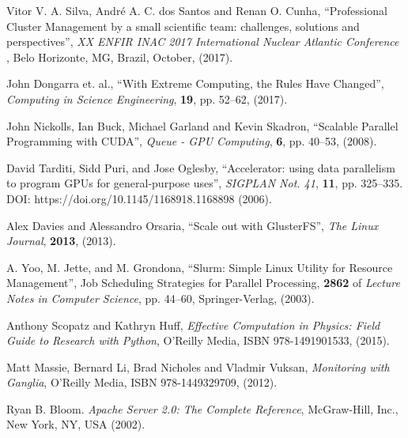 \documentclass[twoside,a4paper,12pt,english]{inac19}
\begin{document}
\begin{thebibliography}{99} %

 Vitor V. A. Silva, Andr\'{e} A. C. dos Santos and Renan O. Cunha, ``Professional Cluster Management
  by a small scientific team: challenges, solutions and perspectives'', \textit{XX ENFIR INAC 2017 International Nuclear Atlantic Conference }, Belo Horizonte, MG, Brazil, October, (2017). 
  
  
 John Dongarra et. al., ``With Extreme Computing, the Rules Have Changed'', \textit{Computing in Science Engineering}, \textbf{19}, pp. 52--62, (2017).
  
 John Nickolls, Ian Buck, Michael Garland and Kevin Skadron, ``Scalable Parallel Programming with CUDA'', \textit{Queue - GPU Computing}, \textbf{6}, pp. 40--53, (2008).
  
 David Tarditi, Sidd Puri, and Jose Oglesby, ``Accelerator: using data parallelism to program GPUs for general-purpose uses'',  \textit{SIGPLAN Not. 41}, \textbf{11}, pp. 325--335. DOI: https://doi.org/10.1145/1168918.1168898 (2006).

 Alex Davies and Alessandro Orsaria, ``Scale out with GlusterFS'', \textit{The Linux Journal}, \textbf{2013}, (2013).

 A. Yoo, M. Jette, and M. Grondona, ``Slurm: Simple Linux Utility for Resource Management'', Job Scheduling Strategies for Parallel Processing, \textbf{2862} of \textit{Lecture Notes in Computer Science}, pp. 44--60, Springer-Verlag, (2003).

   Anthony Scopatz and Kathryn Huff, \textit{Effective Computation in Physics: Field Guide to Research with Python}, O'Reilly Media, ISBN 978-1491901533, (2015).


 Matt Massie, Bernard Li, Brad Nicholes and Vladmir Vuksan, \textit{Monitoring with Ganglia}, O'Reilly Media, ISBN 978-1449329709, (2012).

 Ryan B. Bloom. \textit{Apache Server 2.0: The Complete Reference}, McGraw-Hill, Inc., New York, NY, USA (2002).
  

\end{thebibliography}
\end{document}
